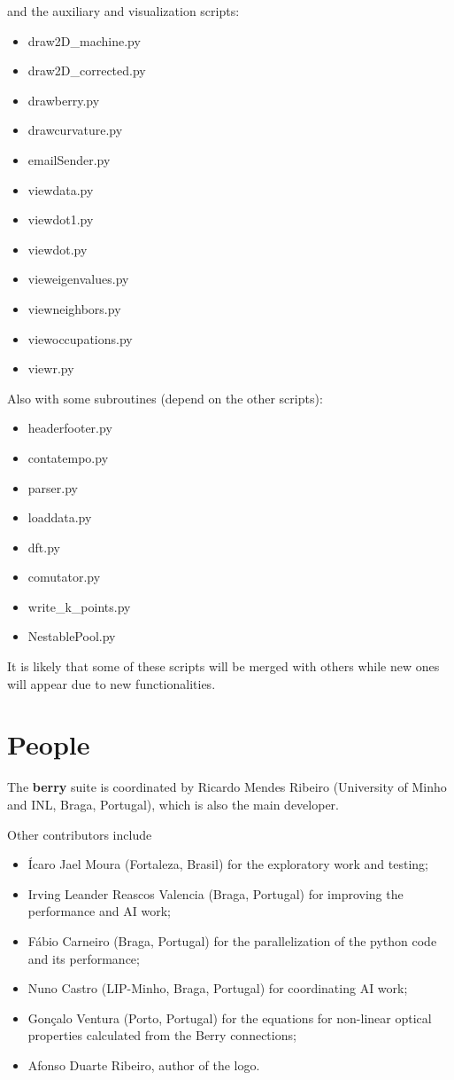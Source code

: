 \documentclass[a4paper,12pt]{report}
\begin{document}
and the auxiliary and visualization scripts:
\begin{itemize}
 \item draw2D\_machine.py
 \item draw2D\_corrected.py
 \item drawberry.py
 \item drawcurvature.py
 \item emailSender.py
 \item viewdata.py
 \item viewdot1.py
 \item viewdot.py
 \item vieweigenvalues.py
 \item viewneighbors.py
 \item viewoccupations.py
 \item viewr.py
\end{itemize}\medskip

Also with some subroutines (depend on the other scripts):
\begin{itemize}
 \item headerfooter.py
 \item contatempo.py
 \item parser.py
 \item loaddata.py
 \item dft.py
 \item comutator.py
 \item write\_k\_points.py
 \item NestablePool.py
\end{itemize}

It is likely that some of these scripts will be merged with others
while new ones will appear due to new functionalities.







\section{People}

The \textbf{berry} suite is coordinated by Ricardo Mendes Ribeiro (University of Minho and INL, Braga, Portugal),
which is also the main developer.\medskip

Other contributors include
\begin{itemize}
 \item Ícaro Jael Moura (Fortaleza, Brasil) for the exploratory work and testing;
 \item Irving Leander Reascos Valencia (Braga, Portugal) for improving the performance
 and AI work;
 \item Fábio Carneiro (Braga, Portugal) for the parallelization of the python code
 and its performance;
 \item Nuno Castro (LIP-Minho, Braga, Portugal) for coordinating AI work;
 \item Gonçalo Ventura (Porto, Portugal) for the equations for non-linear optical properties
 calculated from the Berry connections;
 \item Afonso Duarte Ribeiro, author of the logo.
\end{itemize}
\end{document}
